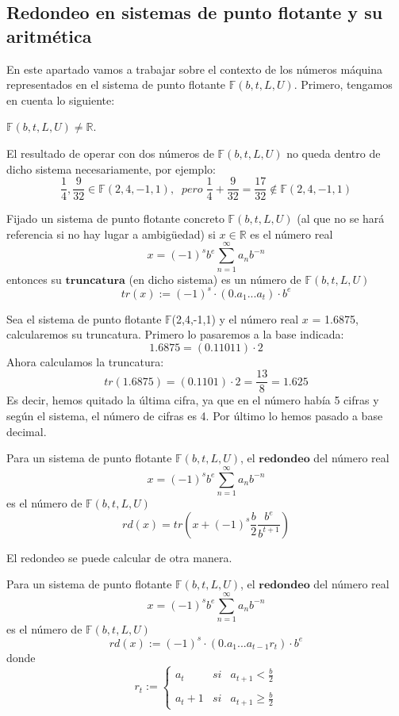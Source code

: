\subsection{Redondeo en sistemas de punto flotante y su aritmética}
En este apartado vamos a trabajar sobre el contexto de los números máquina representados en el sistema de punto flotante $\mathbb{F} (b,t,L,U)$. Primero, tengamos en cuenta lo siguiente:
	\begin{nlist}
	\item $\mathbb{F} (b,t,L,U) \neq \mathbb{R}$.
	\item El resultado de operar con dos números de $\mathbb{F} (b,t,L,U)$ no queda dentro de dicho sistema necesariamente, por ejemplo:
	\[ \frac{1}{4}, \frac{9}{32} \in \mathbb{F} (2,4,-1,1), \; \; pero \; \frac{1}{4} + \frac{9}{32} = \frac{17}{32} \notin \mathbb{F} (2,4,-1,1) \]
	\end{nlist}

\begin{ndef}[Truncatura]
Fijado un sistema de punto flotante concreto $\mathbb{F} (b,t,L,U)$ (al que no se hará referencia si no hay lugar a ambigüedad) si $x \in \mathbb{R}$ es el número real 
\[ x =(-1)^sb^e \sum_{n=1}^{\infty} a_nb^{-n} \]
entonces su $\textbf{truncatura}$ (en dicho sistema) es un número de $\mathbb{F} (b,t,L,U)$
\[ tr(x) := (-1)^s \cdot (0.a_1...a_t) \cdot b^e \]
\end{ndef}

\begin{ejemplo}
Sea el sistema de punto flotante $\mathbb{F}$(2,4,-1,1) y el número real $x$ = 1.6875, calcularemos su truncatura. Primero lo pasaremos a la base indicada:
\[ 1.6875 = (0.11011) \cdot 2 \]
Ahora calculamos la truncatura:
\[ tr(1.6875) = (0.1101) \cdot 2 = \frac{13}{8} = 1.625 \]
Es decir, hemos quitado la última cifra, ya que en el número había 5 cifras y según el sistema, el número de cifras es 4. Por último lo hemos pasado a base decimal.
\end{ejemplo}

\begin{ndef}
Para un sistema de punto flotante  $\mathbb{F} (b,t,L,U)$, el $\textbf{redondeo}$ del número real
\[ x = (-1)^sb^e \sum_{n=1}^{\infty} a_nb^{-n} \]
es el número de $\mathbb{F} (b,t,L,U)$
\[ rd(x) = tr \left( x + (-1)^s \frac{b}{2} \frac{b^e}{b^{t+1}} \right) \]
\end{ndef}

El redondeo se puede calcular de otra manera.

\begin{nprop}
Para un sistema de punto flotante  $\mathbb{F} (b,t,L,U)$, el $\textbf{redondeo}$ del número real
\[ x = (-1)^sb^e \sum_{n=1}^{\infty} a_nb^{-n} \]
es el número de $\mathbb{F} (b,t,L,U)$
\[ rd(x) := (-1)^s \cdot (0.a_1...a_{t-1}r_t) \cdot b^e \]
donde
\[ r_t := \left\{ \begin{array}{lcc}
a_t & si & a_{t+1} < \frac{b}{2}\\
\\ a_t +1 & si & a_{t+1} \geq \frac{b}{2}
\end{array} 
\right. \]
\end{nprop}


